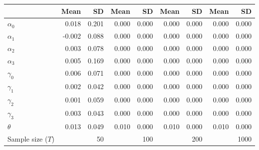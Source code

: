 
\begin{tabular}[t]{lrrrrrrrr}
\toprule
  & Mean & SD & Mean  & SD  & Mean   & SD   & Mean    & SD   \\
\midrule
$\alpha_{0}$ & 0.018 & 0.201 & 0.000 & 0.000 & 0.000 & 0.000 & 0.000 & 0.000\\
$\alpha_{1}$ & -0.002 & 0.088 & 0.000 & 0.000 & 0.000 & 0.000 & 0.000 & 0.000\\
$\alpha_{2}$ & 0.003 & 0.078 & 0.000 & 0.000 & 0.000 & 0.000 & 0.000 & 0.000\\
$\alpha_{3}$ & 0.005 & 0.169 & 0.000 & 0.000 & 0.000 & 0.000 & 0.000 & 0.000\\
$\gamma_{0}$ & 0.006 & 0.071 & 0.000 & 0.000 & 0.000 & 0.000 & 0.000 & 0.000\\
$\gamma_{1}$ & 0.002 & 0.042 & 0.000 & 0.000 & 0.000 & 0.000 & 0.000 & 0.000\\
$\gamma_{2}$ & 0.001 & 0.059 & 0.000 & 0.000 & 0.000 & 0.000 & 0.000 & 0.000\\
$\gamma_{3}$ & 0.003 & 0.043 & 0.000 & 0.000 & 0.000 & 0.000 & 0.000 & 0.000\\
$\theta$ & 0.013 & 0.049 & 0.010 & 0.000 & 0.010 & 0.000 & 0.010 & 0.000\\
Sample size ($T$) &  & 50 &  & 100 &  & 200 &  & 1000\\
\bottomrule
\end{tabular}
